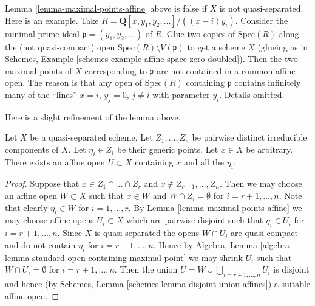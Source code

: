 \begin{remark}
\label{remark-maximal-points-affine}
Lemma \ref{lemma-maximal-points-affine} above is false if $X$
is not quasi-separated. Here is an example. Take
$R = \mathbf{Q}[x, y_1, y_2, \ldots]/((x-i)y_i)$.
Consider the minimal prime ideal $\mathfrak p = (y_1, y_2, \ldots)$
of $R$. Glue two copies of $\text{Spec}(R)$ along the
(not quasi-compact) open $\text{Spec}(R) \setminus V(\mathfrak p)$
to get a scheme $X$ (glueing as in
Schemes, Example \ref{schemes-example-affine-space-zero-doubled}).
Then the two maximal points of $X$ corresponding to $\mathfrak p$
are not contained in a common affine open. The reason is
that any open of $\text{Spec}(R)$ containing $\mathfrak p$
contains infinitely many of the ``lines'' $x = i$, $y_j = 0$,
$j \not = i$ with parameter $y_i$. Details omitted.
\end{remark}

\noindent
Here is a slight refinement of the lemma above.

\begin{lemma}
\label{lemma-point-and-maximal-points-affine}
Let $X$ be a quasi-separated scheme. Let $Z_1, \ldots, Z_n$ be pairwise
distinct irreducible components of $X$. Let $\eta_i \in Z_i$ be their
generic points. Let $x \in X$ be arbitrary.
There exists an affine open $U \subset X$ containing
$x$ and all the $\eta_i$.
\end{lemma}

\begin{proof}
Suppose that $x \in Z_1 \cap \ldots \cap Z_r$ and
$x \not \in Z_{r + 1}, \ldots, Z_n$. Then we may choose
an affine open $W \subset X$ such that
$x \in W$ and $W \cap Z_i = \emptyset$ for
$i = r + 1, \ldots, n$. Note that clearly $\eta_i \in W$
for $i = 1, \ldots, r$. By Lemma \ref{lemma-maximal-points-affine}
we may choose affine opens $U_i \subset X$ which are pairwise
disjoint such that $\eta_i \in U_i$ for $i = r + 1, \ldots, n$.
Since $X$ is quasi-separated the opens $W \cap U_i$
are quasi-compact and do not contain $\eta_i$ for
$i = r + 1, \ldots, n$. Hence by
Algebra, Lemma \ref{algebra-lemma-standard-open-containing-maximal-point}
we may shrink $U_i$ such that $W \cap U_i = \emptyset$
for $i = r + 1, \ldots, n$. Then the union
$U = W \cup \bigcup_{i = r + 1, \ldots, n} U_i$ is disjoint and hence
(by Schemes, Lemma \ref{schemes-lemma-disjoint-union-affines})
a suitable affine open.
\end{proof}

